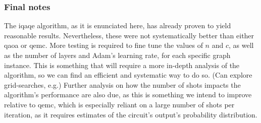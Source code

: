 \subsubsection*{Final notes}
The \acrshort{iqaqe} algorithm, as it is enunciated here, has already proven to yield reasonable results. Nevertheless, these were not systematically better than either \acrshort{qaoa} or \acrshort{qemc}. More testing is required to fine tune the values of $n$ and $c$, as well as the number of layers and Adam's learning rate, for each specific graph instance. This is something that will require a more in-depth analysis of the algorithm, so we can find an efficient and systematic way to do so. (Can explore grid-searches, e.g.) Further analysis on how the number of shots impacts the algorithm's performance are also due, as this is something we intend to improve relative to \acrshort{qemc}, which is especially reliant on a large number of shots per iteration, as it requires estimates of the circuit's output's probability distribution.







